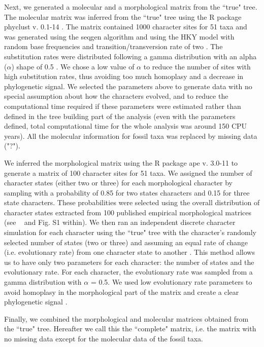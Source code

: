 \documentclass[10pt,letterpaper]{article}
\begin{document}
Next, we generated a molecular and a morphological matrix from the ``true" tree. The molecular matrix was inferred from the ``true" tree using the R package phyclust v. 0.1-14 \cite{chen2011}. The matrix contained 1000 character sites for 51 taxa and was generated using the seqgen algorithm \cite{ranbaut1997seqgen} and using the HKY model \cite{HKY85} with random base frequencies and transition/transversion rate of two \cite{douadycomparison2003}. The substitution rates were distributed following a gamma distribution with an alpha ($\alpha$) shape of 0.5 \cite{yangamong-site1996}. We chose a low value of $\alpha$ to reduce the number of sites with high substitution rates, thus avoiding too much homoplasy and a decrease in phylogenetic signal. We selected the parameters above to generate data with no special assumption about how the characters evolved, and to reduce the computational time required if these parameters were estimated rather than defined in the tree building part of the analysis (even with the parameters defined, total computational time for the whole analysis was around 150 CPU years). All the molecular information for fossil taxa was replaced by missing data ("?").

We inferred the morphological matrix using the R package ape v. 3.0-11 \cite{paradisape:2004} to generate a matrix of 100 character sites for 51 taxa. We assigned the number of character states (either two or three) for each morphological character by sampling with a probability of 0.85 for two states characters and 0.15 for three state characters. These probabilities were selected using the overall distribution of character states extracted from 100 published empirical morphological matrices (see ~ and Fig. S1 within). We then ran an independent discrete character simulation for each character using the ``true" tree with the character's randomly selected number of states (two or three) and assuming an equal rate of change (i.e. evolutionary rate) from one character state to another \cite{Pagel22011994}. This method allows us to have only two parameters for each character: the number of states and the evolutionary rate. For each character, the evolutionary rate was sampled from a gamma distribution with $\alpha$ = 0.5. We used low evolutionary rate parameters to avoid homoplasy in the morphological part of the matrix and create a clear phylogenetic signal \cite{wagner2000,davalosintegrating2014,wrightbayesian2014}.

Finally, we combined the morphological and molecular matrices obtained from the ``true" tree. Hereafter we call this the ``complete" matrix, i.e. the matrix with no missing data except for the molecular data of the fossil taxa.
\end{document}
